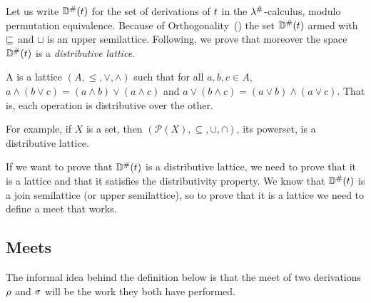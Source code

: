 \bigskip

Let us write $\mathbb{D}^{\mathtt{\#}}(t)$ for the set of derivations of
$t$ in the $\lambda^{\mathtt{\#}}$-calculus,
modulo permutation equivalence.
Because of Orthogonality~()
the set $\mathbb{D}^{\mathtt{\#}}(t)$ armed with $\sqsubseteq$ and $\sqcup$ is an upper semilattice.
Following, we prove that moreover the space $\mathbb{D}^{\mathtt{\#}}(t)$
is a {\em distributive lattice}.

\begin{definition}
A  is a lattice $(A, \leq, \vee, \wedge)$
such that for all $a,b,c \in A$,
$a \wedge (b \vee c) = (a \wedge b) \vee (a \wedge c)$ and
$a \vee (b \wedge c) = (a \vee b) \wedge (a \vee c)$.
That is, each operation is distributive over the other.
\end{definition}

\begin{example}
For example, if $X$ is a set, then $(\mathcal{P}(X), \subseteq, \cup, \cap)$,
its powerset,
is a distributive lattice.
\end{example}

If we want to prove that $\mathbb{D}^{\mathtt{\#}}(t)$ is a distributive lattice,
we need to prove that it is a lattice and that it satisfies the distributivity property.
We know that $\mathbb{D}^{\mathtt{\#}}(t)$ is a join semilattice (or upper semilattice), so
to prove that it is a lattice we need to define a meet that works.

\subsection*{Meets}

The informal idea behind the definition below
is that the meet of two derivations $\rho$ and $\sigma$
will be the work they both have performed.

